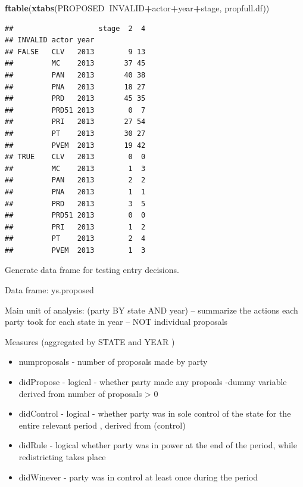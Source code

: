 \documentclass[
]{article}
\newenvironment{Shaded}{\begin{snugshade}}{\end{snugshade}}
\newcommand{\KeywordTok}[1]{\textcolor[rgb]{0.13,0.29,0.53}{\textbf{#1}}}
\newcommand{\NormalTok}[1]{#1}
\newcommand{\OperatorTok}[1]{\textcolor[rgb]{0.81,0.36,0.00}{\textbf{#1}}}
\providecommand{\tightlist}{%
  \setlength{\itemsep}{0pt}\setlength{\parskip}{0pt}}
\begin{document}
\begin{Shaded}
\begin{Highlighting}[]
\KeywordTok{ftable}\NormalTok{(}\KeywordTok{xtabs}\NormalTok{(PROPOSED}\OperatorTok{~}\NormalTok{INVALID}\OperatorTok{+}\NormalTok{actor}\OperatorTok{+}\NormalTok{year}\OperatorTok{+}\NormalTok{stage, propfull.df))}
\end{Highlighting}
\end{Shaded}

\begin{verbatim}
##                    stage  2  4
## INVALID actor year            
## FALSE   CLV   2013        9 13
##         MC    2013       37 45
##         PAN   2013       40 38
##         PNA   2013       18 27
##         PRD   2013       45 35
##         PRD51 2013        0  7
##         PRI   2013       27 54
##         PT    2013       30 27
##         PVEM  2013       19 42
## TRUE    CLV   2013        0  0
##         MC    2013        1  3
##         PAN   2013        2  2
##         PNA   2013        1  1
##         PRD   2013        3  5
##         PRD51 2013        0  0
##         PRI   2013        1  2
##         PT    2013        2  4
##         PVEM  2013        1  3
\end{verbatim}

Generate data frame for testing entry decisions.

Data frame: ys.proposed

Main unit of analysis: (party BY state AND year) -- summarize the
actions each party took for each state in year -- NOT individual
proposals

Measures (aggregated by STATE and YEAR )

\begin{itemize}
\tightlist
\item
  numproposals - number of proposals made by party
\item
  didPropose - logical - whether party made any propoals -dummy variable
  derived from number of proposals \textgreater{} 0
\item
  didControl - logical - whether party was in sole control of the state
  for the entire relevant period , derived from (control)
\item
  didRule - logical whether party was in power at the end of the period,
  while redistricting takes place
\item
  didWinever - party was in control at least once during the period
\end{itemize}
\end{document}
